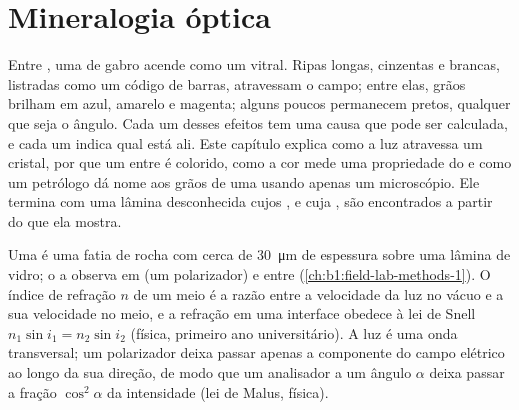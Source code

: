 \chapter{Mineralogia óptica}\label{ch:b1:optical-mineralogy}

Entre , uma  de gabro acende como um vitral. Ripas longas, cinzentas e brancas, listradas como um código de barras, atravessam o campo; entre elas, grãos brilham em azul, amarelo e magenta; alguns poucos permanecem pretos, qualquer que seja o ângulo. Cada um desses efeitos tem uma causa que pode ser calculada, e cada um indica qual  está ali. Este capítulo explica como a luz atravessa um cristal, por que um  entre  é colorido, como a cor mede uma propriedade do  e como um petrólogo dá nome aos grãos de uma  usando apenas um microscópio. Ele termina com uma lâmina desconhecida cujos , e cuja , são encontrados a partir do que ela mostra.

\begin{recall}
Uma  é uma fatia de rocha com cerca de \qty{30}{\micro m} de espessura sobre uma lâmina de vidro; o  a observa em  (um polarizador) e entre  (\cref{ch:b1:field-lab-methods-1}). O índice de refração $n$ de um meio é a razão entre a velocidade da luz no vácuo e a sua velocidade no meio, e a refração em uma interface obedece à lei de Snell $n_1\sin i_1 = n_2\sin i_2$ (física, primeiro ano universitário). A luz é uma onda transversal; um polarizador deixa passar apenas a componente do campo elétrico ao longo da sua direção, de modo que um analisador a um ângulo $\alpha$ deixa passar a fração $\cos^2\alpha$ da intensidade (lei de Malus, física).
\end{recall}

